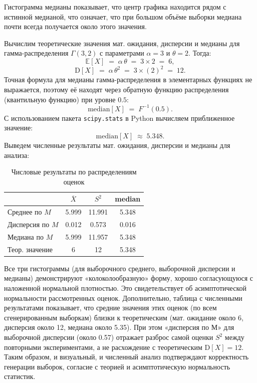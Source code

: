\documentclass[a4paper,12pt]{article}
\begin{document}
Гистограмма медианы показывает, что центр графика находится рядом с истинной медианой, что означает, что при большом объёме выборки медиана почти всегда получается около этого значения.

Вычислим теоретические значения мат. ожидания, дисперсии и медианы для гамма-распределения \(\Gamma(3,2)\) с параметрами 
\(\alpha = 3\) и \(\theta = 2\). Тогда:
\[
\mathbb{E}[X] \;=\; \alpha\,\theta \;=\; 3 \times 2 \;=\; 6,
\]
\[
\mathrm{D}[X] \;=\; \alpha\,\theta^2 \;=\; 3 \times (2)^2 \;=\; 12.
\]
Точная формула для медианы гамма-распределения в элементарных функциях не выражается, поэтому её находят через обратную функцию распределения (квантильную функцию) при уровне $0.5$:
\[
\mathrm{median}[X] \;=\; F^{-1}(0.5).
\]
С использованием пакета \texttt{scipy.stats} в Python вычисляем приближенное значение:
\[
\mathrm{median}[X] \;\approx\; 5.348.
\]
Выведем численные результаты мат. ожидания, дисперсии и медианы для анализа:
\begin{table}[H]
    \centering
    \begin{tabular}{|l|ccc|}
        \hline
        & $\overline{X}$ & $S^2$ & median \\ 
        \hline
        Среднее по $M$  & 5.999 & 11.991 & 5.348 \\
        Дисперсия по $M$ & 0.012 & 0.573 & 0.016 \\
        Медиана по $M$   & 5.999 & 11.957 & 5.348 \\
        \hline
        Теор. значение & 6 & 12 & 5.348 \\
        \hline
    \end{tabular}
    \caption{Числовые результаты по распределениям оценок}
\end{table}
Все три гистограммы (для выборочного среднего, выборочной дисперсии и медианы) демонстрируют «колоколообразную» форму, хорошо согласующуюся с наложенной нормальной плотностью. Это свидетельствует об асимптотической нормальности рассмотренных оценок. Дополнительно, таблица с численными результатами показывает, что средние значения этих оценок (по всем сгенерированным выборкам) близки к теоретическим (мат. ожидание около 6, дисперсия около 12, медиана около 5.35). При этом «дисперсия по М» для выборочной дисперсии (около 0.57) отражает разброс самой оценки \(S^2\) между повторными экспериментами, а не расхождение с теоретическим \( \mathrm{D}[X]=12 \). Таким образом, и визуальный, и численный анализ подтверждают корректность генерации выборок, согласие с теорией и асимптотическую нормальность статистик.
\end{document}
